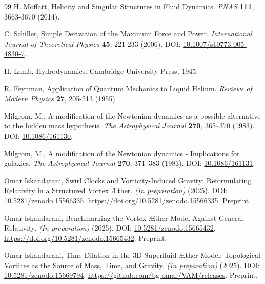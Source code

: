 \documentclass[preprint]{revtex4-2}
\begin{document}
\begin{thebibliography}{99}
H. Moffatt,
\newblock Helicity and Singular Structures in Fluid Dynamics.
\textit{PNAS} \textbf{111}, 3663-3670 (2014).


C. Schiller,
\newblock Simple Derivation of the Maximum Force and Power.
\textit{International Journal of Theoretical Physics} \textbf{45}, 221-233 (2006).
\newblock DOI: \href{https://doi.org/10.1007/s10773-005-4830-7}{10.1007/s10773-005-4830-7}.


H. Lamb,
\newblock Hydrodynamics.
\newblock Cambridge University Press, 1945.


R. Feynman,
\newblock Application of Quantum Mechanics to Liquid Helium.
\textit{Reviews of Modern Physics} \textbf{27}, 205-213 (1955).


Milgrom, M.,
\newblock A modification of the Newtonian dynamics as a possible alternative to the hidden mass hypothesis.
\textit{The Astrophysical Journal} \textbf{270}, 365--370 (1983).
\newblock DOI: \href{https://doi.org/10.1086/161130}{10.1086/161130}.


Milgrom, M.,
\newblock A modification of the Newtonian dynamics - Implications for galaxies.
\textit{The Astrophysical Journal} \textbf{270}, 371--383 (1983).
\newblock DOI: \href{https://doi.org/10.1086/161131}{10.1086/161131}.


Omar Iskandarani,
\newblock Swirl Clocks and Vorticity-Induced Gravity: Reformulating Relativity in a Structured Vortex Æther.
\textit{(In preparation)} (2025).
\newblock DOI: \href{https://doi.org/10.5281/zenodo.15566335}{10.5281/zenodo.15566335}.
\newblock \url{https://doi.org/10.5281/zenodo.15566335}.
\newblock Preprint.


Omar Iskandarani,
\newblock Benchmarking the Vortex Æther Model Against General Relativity.
\textit{(In preparation)} (2025).
\newblock DOI: \href{https://doi.org/10.5281/zenodo.15665432}{10.5281/zenodo.15665432}.
\newblock \url{https://doi.org/10.5281/zenodo.15665432}.
\newblock Preprint.


Omar Iskandarani,
\newblock Time Dilation in the 3D Superfluid Æther Model: Topological Vortices as the Source of Mass, Time, and Gravity.
\textit{(In preparation)} (2025).
\newblock DOI: \href{https://doi.org/10.5281/zenodo.15669794}{10.5281/zenodo.15669794}.
\newblock \url{https://github.com/bg-omar/VAM/releases}.
\newblock Preprint.



\end{thebibliography}
\end{document}
